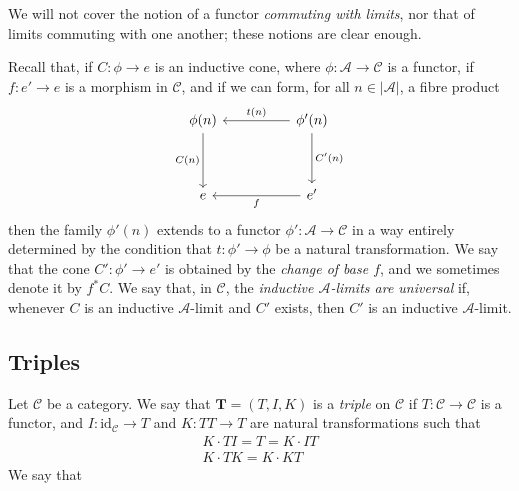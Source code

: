 \documentclass{article}
\newcommand{\oldpage}[1]{\marginpar{\footnotesize$\Big\vert$ \textit{p.~#1}}}
\newcommand{\TT}{\mathbf{T}}
\newcommand{\cat}[1]{\mathcal{#1}}
\newcommand{\id}{\mathrm{id}}
\newcommand{\set}[1]{|#1|}
\begin{document}
We will not cover the notion of a functor \emph{commuting with limits}, nor that of limits commuting with one another;
these notions are clear enough.

Recall that, if $C\colon\phi\to e$ is an inductive cone, where $\phi\colon\cat{A}\to\cat{C}$ is a functor, if $f\colon e'\to e$ is a morphism in $\cat{C}$, and if we can form, for all $n\in\set{\cat{A}}$, a fibre product
\[
  \begin{tikzcd}[sep=huge]
    \phi(n) \ar[d,swap,"C(n)"]
  & \phi'(n) \ar[l,swap,"t(n)"] \ar[d,"C'(n)"]
  \\e
  & e' \ar[l,"f"]
  \end{tikzcd}
\]
then the family $\phi'(n)$ extends to a functor $\phi'\colon\cat{A}\to\cat{C}$ in a way entirely determined by the condition that $t\colon\phi'\to\phi$ be a natural transformation.
We say that the cone $C'\colon\phi'\to e'$ is obtained by the \emph{change of base $f$}, and we sometimes denote it by $f^*C$.
We say that, in $\cat{C}$, the \emph{inductive $\cat{A}$-limits are universal} if, whenever $C$ is an inductive $\cat{A}$-limit and $C'$ exists, then $C'$ is an inductive $\cat{A}$-limit.


\subsection{Triples}

\oldpage{223}
Let $\cat{C}$ be a category.
We say that $\TT=(T,I,K)$ is a \emph{triple} on $\cat{C}$ if $T\colon\cat{C}\to\cat{C}$ is a functor, and $I\colon\id_\cat{C}\to T$ and $K\colon TT\to T$ are natural transformations such that
\[
  \begin{gathered}
    K\cdot TI
    = T
    = K\cdot IT
  \\K\cdot TK
    = K\cdot KT
  \end{gathered}
  \tag{1}
\]
We say that





\nocite{*}
\printbibliography[heading=bibintoc,title=Bibliography]
\end{document}
